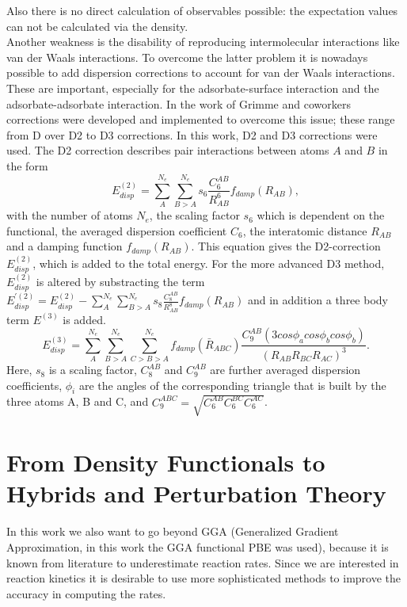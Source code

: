 \documentclass[11pt,DIV=13,BCOR=5mm,a4paper,headinclude]{scrbook}
\begin{document}
Also there is no direct calculation of observables possible: the expectation values can not be calculated via the density.
\\
Another weakness is the disability of reproducing intermolecular interactions like van der Waals interactions.
To overcome the latter problem it is nowadays possible to add dispersion corrections to account for van der Waals interactions.
These are important, especially for the adsorbate-surface interaction and the adsorbate-adsorbate interaction.
In the work of Grimme\cite{grimme06} and coworkers corrections were developed and implemented to overcome this issue; these range from D over D2 to D3 corrections.
In this work, D2 and D3 corrections were used.
The D2 correction describes pair interactions between atoms $A$ and $B$ in the form
\begin{equation}\label{eq:d2}
 E_{disp}^{(2)} =\sum\limits_{A}^{N_e}\sum\limits_{B>A}^{N_e} s_6 \frac{C_6^{AB}}{R_{AB}^6}f_{damp}(R_{AB}),
\end{equation}
with the number of atoms $N_e$, the scaling factor $s_6$ which is dependent on the functional, the averaged dispersion coefficient $C_6$, the interatomic distance $R_{AB}$ and a damping function $f_{damp}(R_{AB})$.
This equation gives the D2-correction $E_{disp}^{(2)}$, which is added to the total energy.
For the more advanced D3 method, $E_{disp}^{(2)}$ is altered by substracting the term $E_{disp}^{\prime(2)}=E_{disp}^{(2)} -\sum\limits_{A}^{N_e}\sum\limits_{B>A}^{N_e} s_8 \frac{C_8^{AB}}{R_{AB}^8}f_{damp}(R_{AB})$ and in addition a three body term $E^{(3)}$ is added.
\begin{equation}
  E_{disp}^{(3)} =\sum\limits_{A}^{N_e}\sum\limits_{B>A}^{N_e}\sum\limits_{C>B>A}^{N_e} f_{damp}(\bar{R}_{ABC}) \frac{C_9^{AB}(3cos\phi_a cos\phi_b cos\phi_b)}{(R_{AB}R_{BC}R_{AC})^3}.
\end{equation}
Here, $s_8$ is a scaling factor, $C_8^{AB}$ and $C_9^{AB}$ are further averaged dispersion coefficients, $\phi_i$ are the angles of the corresponding triangle that is built by the three atoms A, B and C, and $C_9^{ABC}=\sqrt{C_6^{AB}C_6^{BC}C_6^{AC}}$.


\section{From Density Functionals to Hybrids and Perturbation Theory}\label{theorybeyond}
In this work we also want to go beyond GGA (Generalized Gradient Approximation, in this work the GGA functional PBE was used), because it is known from literature to underestimate reaction rates\cite{Zhao05}.
Since we are interested in reaction kinetics it is desirable to use more sophisticated methods to improve the accuracy in computing the rates.
\end{document}
